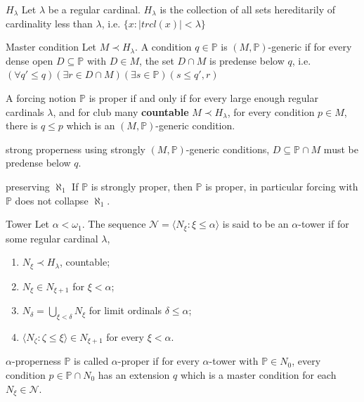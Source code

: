 \documentclass{beamer}
\begin{document}
\begin{frame}
\begin{block}{$H_{\lambda}$}
Let $\lambda$ be a regular cardinal. $H_{\lambda}$ is the collection of all sets hereditarily of cardinality less than $\lambda$, \pause i.e. $\lbrace x \colon |tr cl(x)| < \lambda \rbrace$
\end{block}
\pause
\begin{block}{Master condition}
Let $M \prec H_{\lambda}$. A condition $q \in \mathds{P}$ is $(M, \mathds{P})$-generic if for every dense open $D\subseteq \mathds{P}$ with $D \in M$, the set $D\cap M$ is predense below $q$, \pause i.e. $(\forall q' \leq q) (\exists r \in D \cap M) (\exists s \in \mathds{P})(s \leq q', r)$
\end{block}
\pause
\begin{theorem}[Shelah]
A forcing notion $\mathds{P}$ is proper if and only if for every large
enough regular cardinals $\lambda$, and for club many \textbf{countable} $M\prec H_{\lambda}$, for every condition $p \in M$, there is $q \leq p$ which is an $(M, \mathds{P})$-generic condition.
\end{theorem}
\pause
\begin{block}{strong properness}
using strongly $(M, \mathds{P})$-generic conditions, \pause $D \subseteq \mathds{P} \cap M$ must be predense below $q$.
\end{block}
\end{frame}
\begin{frame}
\begin{block}{preserving $\aleph_1$}
If $\mathds{P}$ is strongly proper, then $\mathds{P}$ is proper, in particular forcing with $\mathds{P}$ does not collapse $\aleph_1$.
\end{block}
\pause
\begin{block}{Tower}
Let $\alpha< \omega_1$. The sequence $\mathcal{N}=\langle N_{\xi}\colon \xi \leq \alpha \rangle$ is said to be an $\alpha$-tower if for some regular cardinal $\lambda$,
\begin{enumerate}
\item
$N_{\xi} \prec H_{\lambda}$, countable;
\item
$N_{\xi} \in N_{\xi +1}$ for $\xi < \alpha$;
\item
$N_{\delta}= \bigcup_{\xi < \delta}N_{\xi}$ for limit ordinals $\delta \leq \alpha$;
\item
$\langle N_{\zeta}: \zeta \leq \xi \rangle \in N_{\xi +1}$ for every $\xi < \alpha$.
\end{enumerate}
\end{block}
\pause
\begin{block}{$\alpha$-properness}
$\mathbb{P}$ is called $\alpha$-proper if for every $\alpha$-tower
with $\mathbb{P} \in N_0$, every condition $p \in \mathbb{P} \cap N_0$ has an extension $q$ which is a master condition for each $N_{\xi} \in \mathcal{N}$.
\end{block}
\end{frame}
\end{document}
